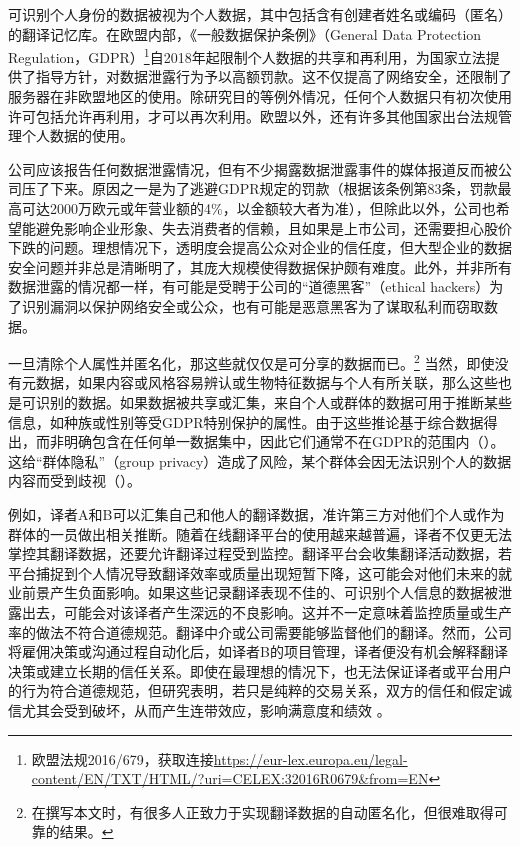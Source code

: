 \documentclass[output=paper]{langscibook}
\begin{document}
可识别个人身份的数据被视为个人数据，其中包括含有创建者姓名或编码（匿名）的翻译记忆库。在欧盟内部，《一般数据保护条例》（General Data Protection Regulation，GDPR）\footnote{欧盟法规2016/679，获取连接\url{https://eur-lex.europa.eu/legal-content/EN/TXT/HTML/?uri=CELEX:32016R0679&from=EN}}自2018年起限制个人数据的共享和再利用，为国家立法提供了指导方针，对数据泄露行为予以高额罚款。这不仅提高了网络安全，还限制了服务器在非欧盟地区的使用。除研究目的等例外情况，任何个人数据只有初次使用许可包括允许再利用，才可以再次利用。欧盟以外，还有许多其他国家出台法规管理个人数据的使用。

公司应该报告任何数据泄露情况，但有不少揭露数据泄露事件的媒体报道反而被公司压了下来。原因之一是为了逃避GDPR规定的罚款（根据该条例第83条，罚款最高可达2000万欧元或年营业额的4\%，以金额较大者为准），但除此以外，公司也希望能避免影响企业形象、失去消费者的信赖，且如果是上市公司，还需要担心股价下跌的问题。理想情况下，透明度会提高公众对企业的信任度，但大型企业的数据安全问题并非总是清晰明了，其庞大规模使得数据保护颇有难度。此外，并非所有数据泄露的情况都一样，有可能是受聘于公司的“道德黑客”（ethical hackers）为了识别漏洞以保护网络安全或公众，也有可能是恶意黑客为了谋取私利而窃取数据。

一旦清除个人属性并匿名化，那这些就仅仅是可分享的数据而已。\footnote{在撰写本文时，有很多人正致力于实现翻译数据的自动匿名化，但很难取得可靠的结果。} 当然，即使没有元数据，如果内容或风格容易辨认或生物特征数据与个人有所关联，那么这些也是可识别的数据。如果数据被共享或汇集，来自个人或群体的数据可用于推断某些信息，如种族或性别等受GDPR特别保护的属性。由于这些推论基于综合数据得出，而非明确包含在任何单一数据集中，因此它们通常不在GDPR的范围内（\citealt{WachterMittelstadt2019}）。这给“群体隐私”（group privacy）造成了风险，某个群体会因无法识别个人的数据内容而受到歧视（\citealt{FloridiTaddeo2016}）。

例如，译者A和B可以汇集自己和他人的翻译数据，准许第三方对他们个人或作为群体的一员做出相关推断。随着在线翻译平台的使用越来越普遍，译者不仅更无法掌控其翻译数据，还要允许翻译过程受到监控。翻译平台会收集翻译活动数据，若平台捕捉到个人情况导致翻译效率或质量出现短暂下降，这可能会对他们未来的就业前景产生负面影响。如果这些记录翻译表现不佳的、可识别个人信息的数据被泄露出去，可能会对该译者产生深远的不良影响。这并不一定意味着监控质量或生产率的做法不符合道德规范。翻译中介或公司需要能够监督他们的翻译。然而，公司将雇佣决策或沟通过程自动化后，如译者B的项目管理，译者便没有机会解释翻译决策或建立长期的信任关系。即使在最理想的情况下，也无法保证译者或平台用户的行为符合道德规范，但研究表明，若只是纯粹的交易关系，双方的信任和假定诚信尤其会受到破坏，从而产生连带效应，影响满意度和绩效 \citep{WhippleNyaga2010}。
\end{document}
